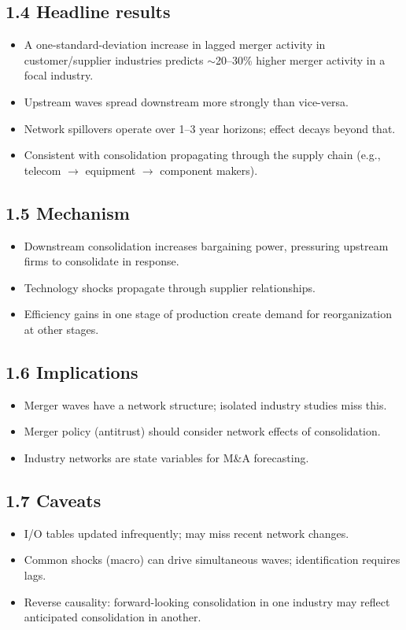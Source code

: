 \documentclass[11pt]{article}
\begin{document}
\subsection*{1.4 Headline results}
\begin{itemize}
\item A one-standard-deviation increase in lagged merger activity in customer/supplier industries predicts $\sim$20--30\% higher merger activity in a focal industry.
\item Upstream waves spread downstream more strongly than vice-versa.
\item Network spillovers operate over 1--3 year horizons; effect decays beyond that.
\item Consistent with consolidation propagating through the supply chain (e.g., telecom $\to$ equipment $\to$ component makers).
\end{itemize}

\subsection*{1.5 Mechanism}
\begin{itemize}
\item Downstream consolidation increases bargaining power, pressuring upstream firms to consolidate in response.
\item Technology shocks propagate through supplier relationships.
\item Efficiency gains in one stage of production create demand for reorganization at other stages.
\end{itemize}

\subsection*{1.6 Implications}
\begin{itemize}
\item Merger waves have a network structure; isolated industry studies miss this.
\item Merger policy (antitrust) should consider network effects of consolidation.
\item Industry networks are state variables for M\&A forecasting.
\end{itemize}

\subsection*{1.7 Caveats}
\begin{alertbox}
\begin{itemize}
\item I/O tables updated infrequently; may miss recent network changes.
\item Common shocks (macro) can drive simultaneous waves; identification requires lags.
\item Reverse causality: forward-looking consolidation in one industry may reflect anticipated consolidation in another.
\end{itemize}
\end{alertbox}
\end{document}
